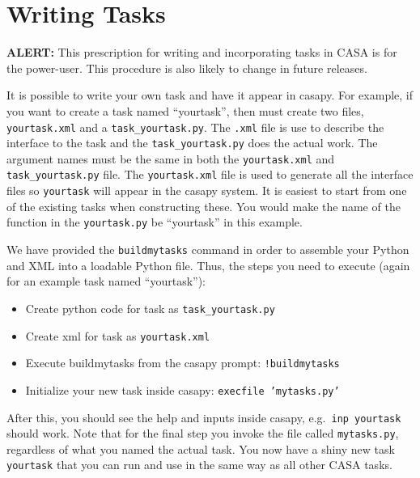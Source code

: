 

\chapter[Appendix: Writing Tasks in CASA]{Writing Tasks}
\label{chapter:write}

{\bf ALERT:} This prescription for writing and incorporating
tasks in CASA is for the power-user.  This procedure is also likely
to change in future releases.

It is possible to write your own task and have it appear in
casapy. For example, if you want to create a task named ``yourtask'',
then must create two files, {\tt yourtask.xml} and a
{\tt task\_yourtask.py}. The {\tt .xml} file is use to describe the interface to
the task and the {\tt task\_yourtask.py} does the actual work.  The argument
names must be the same in both the {\tt yourtask.xml} and {\tt task\_yourtask.py}
file. The {\tt yourtask.xml} file is used to generate all the interface
files so {\tt yourtask} will appear in the casapy system.  It is
easiest to start from one of the existing tasks when constructing
these.  You would make the name of the function in the 
{\tt  yourtask.py} be ``yourtask'' in this example.

We have provided the {\tt buildmytasks} command in order
to assemble your Python and XML into a loadable Python file.  Thus,
the steps you need to execute (again for an example task named ``yourtask''):
\begin{itemize}
\item Create python code for task as {\tt task\_yourtask.py}
\item Create xml for task as {\tt yourtask.xml}
\item Execute buildmytasks from the casapy prompt: {\tt !buildmytasks}
\item Initialize your new task inside casapy: {\tt execfile 'mytasks.py'}
\end{itemize}
After this, you should see the help and inputs inside casapy, e.g.\ 
{\tt inp yourtask} should work.  Note that for the final step you
invoke the file called {\tt mytasks.py}, regardless of what you named
the actual task. You now have a shiny new task {\tt yourtask} that you can run and use
in the same way as all other CASA tasks. 


